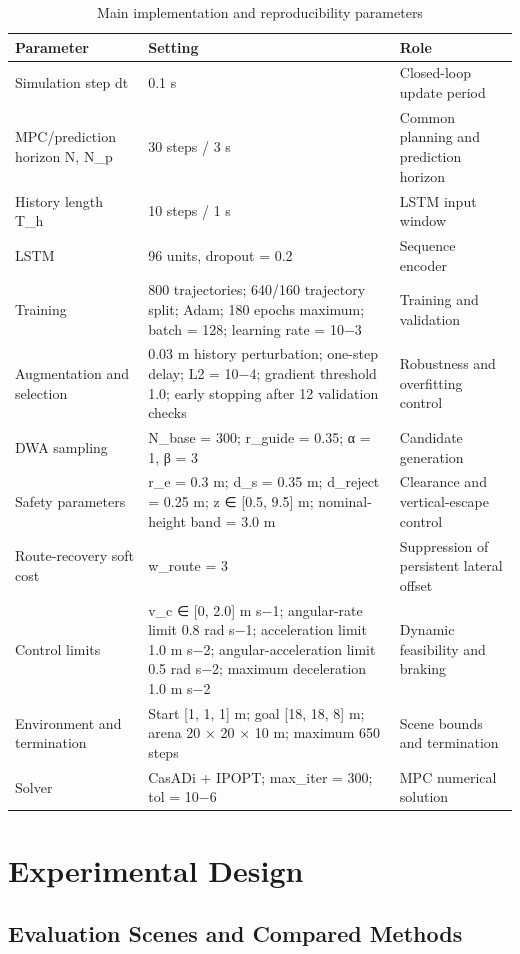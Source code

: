 \documentclass[10pt,a4paper]{article}
\begin{document}
\begin{table}[t]
\centering
\small
\caption{Main implementation and reproducibility parameters}
\label{tab:table-1}
\begin{tabularx}{\linewidth}{YYY}
\toprule
Parameter & Setting & Role \\
\midrule
Simulation step dt & 0.1 s & Closed-loop update period \\
MPC/prediction horizon N, N\_p & 30 steps / 3 s & Common planning and prediction horizon \\
History length T\_h & 10 steps / 1 s & LSTM input window \\
LSTM & 96 units, dropout = 0.2 & Sequence encoder \\
Training & 800 trajectories; 640/160 trajectory split; Adam; 180 epochs maximum; batch = 128; learning rate = 10−3 & Training and validation \\
Augmentation and selection & 0.03 m history perturbation; one-step delay; L2 = 10−4; gradient threshold 1.0; early stopping after 12 validation checks & Robustness and overfitting control \\
DWA sampling & N\_base = 300; r\_guide = 0.35; α = 1, β = 3 & Candidate generation \\
Safety parameters & r\_e = 0.3 m; d\_s = 0.35 m; d\_reject = 0.25 m; z ∈ [0.5, 9.5] m; nominal-height band = 3.0 m & Clearance and vertical-escape control \\
Route-recovery soft cost & w\_route = 3 & Suppression of persistent lateral offset \\
Control limits & v\_c ∈ [0, 2.0] m s−1; angular-rate limit 0.8 rad s−1; acceleration limit 1.0 m s−2; angular-acceleration limit 0.5 rad s−2; maximum deceleration 1.0 m s−2 & Dynamic feasibility and braking \\
Environment and termination & Start [1, 1, 1] m; goal [18, 18, 8] m; arena 20 × 20 × 10 m; maximum 650 steps & Scene bounds and termination \\
Solver & CasADi + IPOPT; max\_iter = 300; tol = 10−6 & MPC numerical solution \\
\bottomrule
\end{tabularx}
\end{table}

\section{Experimental Design}

\subsection{Evaluation Scenes and Compared Methods}
\end{document}
